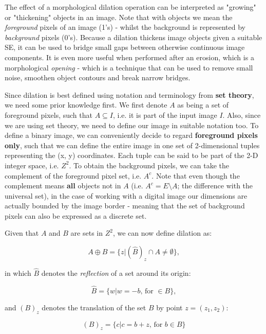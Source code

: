 \documentclass{article}
\begin{document}
The effect of a morphological dilation operation can be interpreted as "growing" or "thickening" objects in an image. Note that with objects we mean the \textit{foreground} pixels of an image (1's) - whilst the background is represented by \textit{background} pixels (0's). Because a dilation thickens image objects given a suitable SE, it can be used to bridge small gaps between otherwise continuous image components. It is even more useful when performed after an erosion, which is a morphological \textit{opening} - which is a technique that can be used to remove small noise, smoothen object contours and break narrow bridges.

Since dilation is best defined using notation and terminology from \textbf{set theory}, we need some prior knowledge first. We first denote $A$ as being a set of foreground pixels, such that $A \subseteq I$, i.e. it is part of the input image $I$. Also, since we are using set theory, we need to define our image in suitable notation too. To define a binary image, we can conveniently decide to regard \textbf{foreground pixels only}, such that we can define the entire image in one set of 2-dimensional tuples representing the (x, y) coordinates. Each tuple can be said to be part of the 2-D integer space, i.e. $Z^2$. To obtain the background pixels, we can take the complement of the foreground pixel set, i.e. $A^c$. Note that even though the complement means \textbf{all} objects not in $A$ (i.e. $A^c = E \setminus A$; the difference with the universal set), in the case of working with a digital image our dimensions are actually bounded by the image border - meaning that the set of background pixels can also be expressed as a discrete set.

Given that $A$ and $B$ are sets in $Z^2$, we can now define dilation as:

\begin{equation}\label{eq:dilation}
    A \oplus B = \{z|(\hat{B})_z \cap A \neq \emptyset\},
\end{equation}

in which $\hat{B}$ denotes the \textit{reflection} of a set around its origin:

\begin{equation}\label{eq:reflection}
    \hat{B} = \{w | w = -b\text{, for }\in B\},
\end{equation}

and $(B)_z$ denotes the translation of the set $B$ by point $z=(z_1, z_2)$:

\begin{equation}\label{eq:translation}
    (B)_z = \{c|c=b+z\text{, for }b\in B\}
\end{equation}
\end{document}
